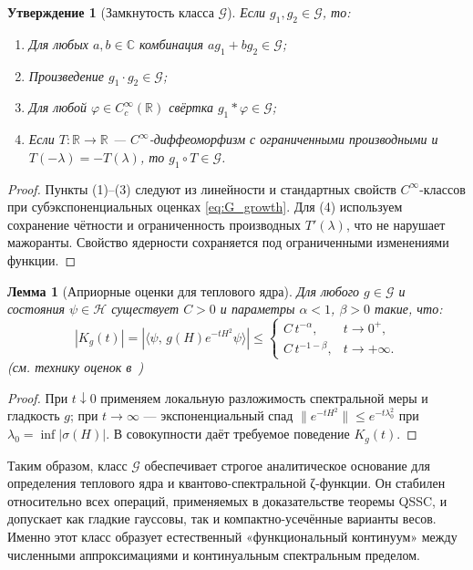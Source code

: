 \documentclass{article}
\numberwithin{equation}{section}
\theoremstyle{plain}
\newtheorem{lemma}{Лемма}
\newtheorem{proposition}{Утверждение}
\theoremstyle{definition}
\theoremstyle{remark}
\def\phi{φ}\def\Phi{Φ}\def\psi{ψ}\def\Psi{Ψ}%
\def\alpha{α}\def\beta{β}\def\gamma{γ}\def\Gamma{Γ}%
\def\infty{∞}\def\partial{∂}\def\sum{Σ}\def\int{∫}%
\def\cdot{·}\def\times{×}\def\pm{±}\def\mp{∓}\def\approx{≈}%
\begin{document}
\begin{proposition}[Замкнутость класса $\mathcal G$]
\label{prop:Gclosure}
Если $g_1,g_2\in\mathcal G$, то:
\begin{enumerate}
\item Для любых $a,b\in\mathbb C$ комбинация $a g_1+b g_2\in\mathcal G$;
\item Произведение $g_1\cdot g_2\in\mathcal G$;
\item Для любой $\phi\in C_c^\infty(\mathbb R)$ свёртка $g_1*\phi\in\mathcal G$;
\item Если $T:\mathbb R\to\mathbb R$ — $C^\infty$-диффеоморфизм с ограниченными производными и $T(-\lambda)=-T(\lambda)$, то $g_1\circ T\in\mathcal G$.
\end{enumerate}
\end{proposition}

\begin{proof}
Пункты (1)–(3) следуют из линейности и стандартных свойств $C^\infty$-классов при субэкспоненциальных оценках \eqref{eq:G_growth}.  
Для (4) используем сохранение чётности и ограниченность производных $T'(\lambda)$, что не нарушает мажоранты.  
Свойство ядерности сохраняется под ограниченными изменениями функции.
\end{proof}

\begin{lemma}[Априорные оценки для теплового ядра]
\label{lemma:Gheat}
Для любого $g\in\mathcal G$ и состояния $\psi\in\mathcal H$ существует $C>0$ и параметры $\alpha<1$, $\beta>0$ такие, что:
\begin{equation}
|K_g(t)| = |\langle\psi,\,g(H)e^{-tH^2}\psi\rangle| 
\le 
\begin{cases}
C\,t^{-\alpha}, & t\to 0^+,\\[3pt]
C\,t^{-1-\beta}, & t\to+\infty.
\end{cases}
\end{equation}
(см. технику оценок в~\cite{Berline2004}) 
\end{lemma}

\begin{proof}
При $t\downarrow0$ применяем локальную разложимость спектральной меры и гладкость $g$;
при $t\to\infty$ — экспоненциальный спад $\|e^{-tH^2}\| \le e^{-t\lambda_0^2}$ 
при $\lambda_0=\inf|\sigma(H)|$.  
В совокупности даёт требуемое поведение $K_g(t)$.
\end{proof}

\noindent
Таким образом, класс $\mathcal G$ обеспечивает строгое аналитическое основание для определения теплового ядра и квантово-спектральной ζ-функции.  
Он стабилен относительно всех операций, применяемых в доказательстве теоремы QSSC, 
и допускает как гладкие гауссовы, так и компактно-усечённые варианты весов.  
Именно этот класс образует естественный «функциональный континуум» между численными аппроксимациями и континуальным спектральным пределом.
\end{document}
